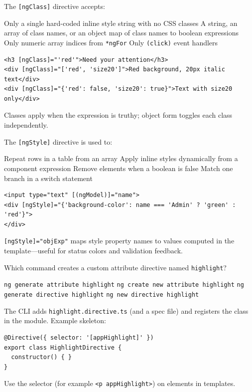 \question[4]
The \lstinline[style=htmlinline]|[ngClass]| directive accepts:
\begin{choices}
  \choice Only a single hard-coded inline style string with no CSS classes
  \CorrectChoice A string, an array of class names, or an object map of class names to boolean expressions
  \choice Only numeric array indices from \lstinline[style=htmlinline]|*ngFor|
  \choice Only \lstinline[style=htmlinline]|(click)| event handlers
\end{choices}
\begin{solution}
\begin{lstlisting}[style=htmlinline]
<h3 [ngClass]="'red'">Need your attention</h3>
<div [ngClass]="['red', 'size20']">Red background, 20px italic text</div>
<div [ngClass]="{'red': false, 'size20': true}">Text with size20 only</div>
\end{lstlisting}
  Classes apply when the expression is truthy; object form toggles each class independently.
\end{solution}

\question[4]
The \lstinline[style=htmlinline]|[ngStyle]| directive is used to:
\begin{choices}
  \choice Repeat rows in a table from an array
  \CorrectChoice Apply inline styles dynamically from a component expression
  \choice Remove elements when a boolean is false
  \choice Match one branch in a switch statement
\end{choices}
\begin{solution}
\begin{lstlisting}[style=htmlinline]
<input type="text" [(ngModel)]="name">
<div [ngStyle]="{'background-color': name === 'Admin' ? 'green' : 'red'}">
</div>
\end{lstlisting}
  \lstinline[style=htmlinline]|[ngStyle]="objExp"| maps style property names to values computed in the template---useful for status colors and validation feedback.
\end{solution}

\question[4]
Which command creates a custom attribute directive named \texttt{highlight}?
\begin{choices}
  \choice \texttt{ng generate attribute highlight}
  \choice \texttt{ng create new attribute highlight}
  \CorrectChoice \texttt{ng generate directive highlight}
  \choice \texttt{ng new directive highlight}
\end{choices}
\begin{solution}
  The CLI adds \texttt{highlight.directive.ts} (and a spec file) and registers the class in the module. Example skeleton:
\begin{lstlisting}[style=ts]
@Directive({ selector: '[appHighlight]' })
export class HighlightDirective {
  constructor() { }
}
\end{lstlisting}
  Use the selector (for example \lstinline[style=htmlinline]|<p appHighlight>|) on elements in templates.
\end{solution}

